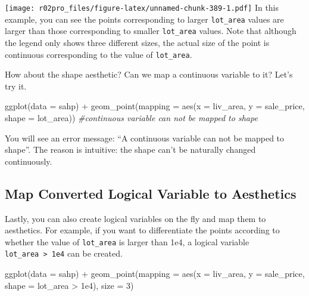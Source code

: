 \documentclass[
]{book}
\newenvironment{Shaded}{\begin{snugshade}}{\end{snugshade}}
\newcommand{\AttributeTok}[1]{\textcolor[rgb]{0.77,0.63,0.00}{#1}}
\newcommand{\CommentTok}[1]{\textcolor[rgb]{0.56,0.35,0.01}{\textit{#1}}}
\newcommand{\DecValTok}[1]{\textcolor[rgb]{0.00,0.00,0.81}{#1}}
\newcommand{\FloatTok}[1]{\textcolor[rgb]{0.00,0.00,0.81}{#1}}
\newcommand{\FunctionTok}[1]{\textcolor[rgb]{0.00,0.00,0.00}{#1}}
\newcommand{\NormalTok}[1]{#1}
\newcommand{\SpecialCharTok}[1]{\textcolor[rgb]{0.00,0.00,0.00}{#1}}
\begin{document}
\texttt{[image: r02pro\_files/figure-latex/unnamed-chunk-389-1.pdf]}
In this example, you can see the points corresponding to larger \texttt{lot\_area} values are larger than those corresponding to smaller \texttt{lot\_area} values. Note that although the legend only shows three different sizes, the actual size of the point is continuous corresponding to the value of \texttt{lot\_area}.

How about the shape aesthetic? Can we map a continuous variable to it? Let's try it.

\begin{Shaded}
\begin{Highlighting}[]
\FunctionTok{ggplot}\NormalTok{(}\AttributeTok{data =}\NormalTok{ sahp) }\SpecialCharTok{+} \FunctionTok{geom\_point}\NormalTok{(}\AttributeTok{mapping =} \FunctionTok{aes}\NormalTok{(}\AttributeTok{x =}\NormalTok{ liv\_area, }\AttributeTok{y =}\NormalTok{ sale\_price, }\AttributeTok{shape =}\NormalTok{ lot\_area)) }\CommentTok{\#continuous variable can not be mapped to shape}
\end{Highlighting}
\end{Shaded}

You will see an error message: ``A continuous variable can not be mapped to shape''. The reason is intuitive: the shape can't be naturally changed continuously.

\hypertarget{map-converted-logical-variable-to-aesthetics}{%
\subsection{Map Converted Logical Variable to Aesthetics}\label{map-converted-logical-variable-to-aesthetics}}

Lastly, you can also create logical variables on the fly and map them to aesthetics. For example, if you want to differentiate the points according to whether the value of \texttt{lot\_area} is larger than 1e4, a logical variable \texttt{lot\_area\ \textgreater{}\ 1e4} can be created.

\begin{Shaded}
\begin{Highlighting}[]
\FunctionTok{ggplot}\NormalTok{(}\AttributeTok{data =}\NormalTok{ sahp) }\SpecialCharTok{+} \FunctionTok{geom\_point}\NormalTok{(}\AttributeTok{mapping =} \FunctionTok{aes}\NormalTok{(}\AttributeTok{x =}\NormalTok{ liv\_area, }\AttributeTok{y =}\NormalTok{ sale\_price, }\AttributeTok{shape =}\NormalTok{ lot\_area }\SpecialCharTok{\textgreater{}} \FloatTok{1e4}\NormalTok{), }\AttributeTok{size =} \DecValTok{3}\NormalTok{)}
\end{Highlighting}
\end{Shaded}
\end{document}
